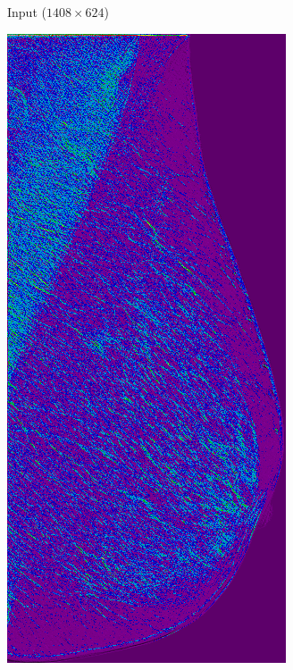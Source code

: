 \documentclass{beamer}
\begin{document}
\begin{frame}
\begin{figure}
\begin{subfigure}{0.19\textwidth}
		        \caption{Input ($1408 \times 624$)}
            \end{subfigure}
	        \begin{subfigure}{0.19\textwidth}
		        \centering
			        \includegraphics[width=\textwidth]{plots/layer_1.png}

\end{subfigure}
\end{figure}
\end{frame}
\end{document}
